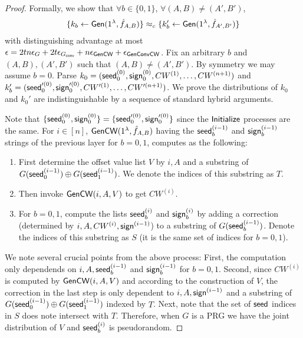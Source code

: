 \begin{proof}
    Formally, we show that $\forall b\in\{0,1\}$, $\forall (A,B)\not=(A',B')$, 
    \[
        \begin{split}
            \{k_b\gets {\sf Gen}(1^\lambda, \hat{f}_{A,B})\}\approx_c\{k_b'\gets{\sf Gen}(1^\lambda, \hat{f}_{A',B'})\}
        \end{split}
    \]
    with distinguishing advantage at most $\epsilon = 2tn\epsilon_{G}+2t \epsilon_{G_{\sf conv}}+n\epsilon_{{\sf Gen}{\sf CW}} +\epsilon_{{\sf Gen}{\sf Conv}{\sf CW}}$.     
    Fix an arbitrary $b$ and $(A,B), (A',B')$ such that $(A,B)\not=(A',B')$. By symmetry we may assume $b=0$. 
    Parse $k_0 = ({\sf seed}_0^{(0)}, {\sf sign}_0^{(0)}, CW^{(1)},\dots,CW^{(n+1)})$ and $k_b' = ({\sf seed}_0'^{(0)},$\linebreak$ {\sf sign}_0'^{(0)}, CW'^{(1)},\dots,CW'^{(n+1)})$. We prove the distributions of $k_0$ and $k_0'$ are indistinguishable by a sequence of standard hybrid arguments. 


    Note that $\{{\sf seed}_0^{(0)}, {\sf sign}_0^{(0)}\} = \{{\sf seed}_0'^{(0)}, {\sf sign}_0'^{(0)}\}$ since the \linebreak$\sf Initialize$ processes are the same. For $i\in[n]$, ${\sf Gen}{\sf CW}(1^\lambda, \hat{f}_{A,B})$ having the ${\sf seed}_b^{(i-1)}$ and ${\sf sign}_b^{(i-1)}$ strings of the previous layer for $b=0,1$, computes as the following: 
    \begin{enumerate}
        \item First determine the offset value list $V$ by $i, A$ and a substring of $G({\sf seed}_0^{(i-1)})\oplus G({\sf seed}_1^{(i-1)})$. We denote the indices of this substring as $T$. 
        \item Then invoke ${\sf Gen}{\sf CW}(i,A,V)$ to get $CW^{(i)}$. 
        \item For $b=0,1$, compute the lists ${\sf seed}_b^{(i)}$ and ${\sf sign}_b^{(i)}$ by adding a correction (determined by $i,A,CW^{(i)}, {\sf sign}^{(i-1)}$) to a substring of $G({\sf seed}_b^{(i-1)})$. Denote the indices of this substring as $S$ (it is the same set of indices for $b=0,1$). 
    \end{enumerate}
    We note several crucial points from the above process: First, the computation only dependends on $i,A,{\sf seed}_b^{(i-1)}$ and ${\sf sign}_b^{(i-1)}$ for $b=0,1$. Second, since $CW^{(i)}$ is computed by ${\sf Gen}{\sf CW}(i,A,V)$ and according to the construction of $V$, the correction in the last step is only dependent to $i, A, {\sf sign}^{(i-1)}$ and a substring of $G({\sf seed}_0^{(i-1)})\oplus G({\sf seed}_1^{(i-1)})$ indexed by $T$. Next, note that the set of ${\sf seed}$ indices in $S$ does note intersect with $T$. Therefore, when $G$ is a PRG we have the joint distribution of $V$ and ${\sf seed}_b^{(i)}$ is pseudorandom. 
    

\end{proof}
